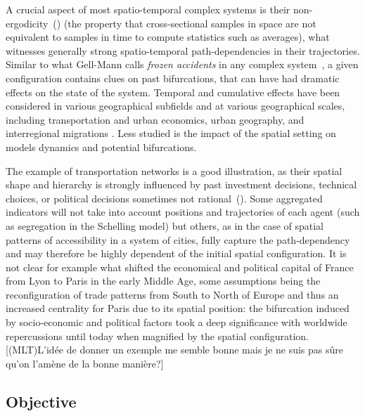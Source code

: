 \documentclass[Afour,sageh,times]{sagej}
\begin{document}
A crucial aspect of most spatio-temporal complex systems is their non-ergodicity~(\cite{pumain2012urban}) (the property that cross-sectional samples in space are not equivalent to samples in time to compute statistics such as averages), what witnesses generally strong spatio-temporal path-dependencies in their trajectories. Similar to what Gell-Mann calls \emph{frozen accidents} in any complex system~\cite{gell1995quark}, a given configuration contains clues on past bifurcations, that can have had dramatic effects on the state of the system. Temporal and cumulative effects have been considered in various geographical subfields and at various geographical scales, including transportation and urban economics, urban geography, and interregional migrations \citep[for e.g.]{White1977,White1978, AllenSanglier1979,Wilson1981,Pumainetal1989,AllenSanglier1981,WeidlichHaag1988,Portugali2000,Wilson2002,Batty2007,AzizAlaouiBertelle2009}. Less studied is the impact of the spatial setting on models dynamics and potential bifurcations.

The example of transportation networks is a good illustration, as their spatial shape and hierarchy is strongly influenced by past investment decisions, technical choices, or political decisions sometimes not rational~(\cite{zembri2010new}). Some aggregated indicators will not take into account positions and trajectories of each agent (such as segregation in the Schelling model) but others, as in the case of spatial patterns of accessibility in a system of cities, fully capture the path-dependency and may therefore be highly dependent of the initial spatial configuration. It is not clear for example what shifted the economical and political capital of France from Lyon to Paris in the early Middle Age, some assumptions being the reconfiguration of trade patterns from South to North of Europe and thus an increased centrality for Paris due to its spatial position: the bifurcation induced by socio-economic and political factors took a deep significance with worldwide repercussions until today when magnified by the spatial configuration. [(MLT)L'idée de donner un exemple me semble bonne mais je ne suis pas sûre qu'on l'amène de la bonne manière?]


\subsection{Objective}
\end{document}
